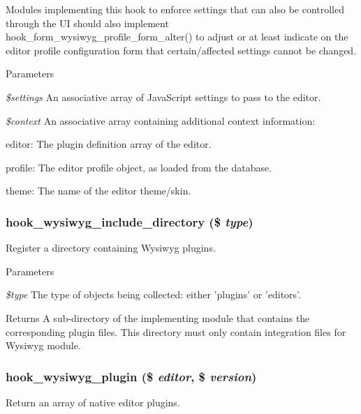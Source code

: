 Modules implementing this hook to enforce settings that can also be controlled through the UI should also implement hook\_\-form\_\-wysiwyg\_\-profile\_\-form\_\-alter() to adjust or at least indicate on the editor profile configuration form that certain/affected settings cannot be changed.


\begin{DoxyParams}{Parameters}
\item[{\em \$settings}]An associative array of JavaScript settings to pass to the editor. \item[{\em \$context}]An associative array containing additional context information:
\begin{DoxyItemize}
\item editor: The plugin definition array of the editor.
\item profile: The editor profile object, as loaded from the database.
\item theme: The name of the editor theme/skin. 
\end{DoxyItemize}\end{DoxyParams}
\hypertarget{wysiwyg_8api_8php_a6cfdf97fd9de777197d9bae384755aac}{
\subsubsection[{hook\_\-wysiwyg\_\-include\_\-directory}]{\setlength{\rightskip}{0pt plus 5cm}hook\_\-wysiwyg\_\-include\_\-directory (\$ {\em type})}}
\label{wysiwyg_8api_8php_a6cfdf97fd9de777197d9bae384755aac}
Register a directory containing Wysiwyg plugins.


\begin{DoxyParams}{Parameters}
\item[{\em \$type}]The type of objects being collected: either 'plugins' or 'editors'. \end{DoxyParams}
\begin{DoxyReturn}{Returns}
A sub-\/directory of the implementing module that contains the corresponding plugin files. This directory must only contain integration files for Wysiwyg module. 
\end{DoxyReturn}
\hypertarget{wysiwyg_8api_8php_abad2b35b32be0b20d73006b73205045c}{
\subsubsection[{hook\_\-wysiwyg\_\-plugin}]{\setlength{\rightskip}{0pt plus 5cm}hook\_\-wysiwyg\_\-plugin (\$ {\em editor}, \/  \$ {\em version})}}
\label{wysiwyg_8api_8php_abad2b35b32be0b20d73006b73205045c}
Return an array of native editor plugins.

